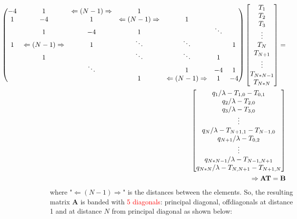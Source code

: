 \documentclass[12pt]{amsart}   %
\begin{document}
\begin{eqnarray} \label{eq:16}
\hspace{-3cm}
\begin{pmatrix}
-4 & 1 & \Leftarrow(N-1)\Rightarrow & 1 &&&\\
1 & -4 & 1 & \Leftarrow(N-1)\Rightarrow & 1 &&\\
 & 1 & -4 & 1 & &\ddots&\\
1 & \Leftarrow(N-1)\Rightarrow & 1 & \ddots &\ddots&&1\\
 & 1 &  & \ddots &\ddots&1&\\
 &  & \ddots & &1&-4&1\\
 &  &  &1 &\Leftarrow(N-1)\Rightarrow& 1&-4\\
\end{pmatrix} \begin{bmatrix}
T_{1}\\
T_{2}\\
T_{3}\\
\vdots \\
T_{N}\\
T_{N+1}\\
\vdots\\
T_{N*N-1}\\
T_{N*N}\\
\end{bmatrix}  = \nonumber \\
\begin{bmatrix}
{q_{1}}/{\lambda}-T_{1,0}-T_{0,1}\\
{q_{2}}/{\lambda}-T_{2,0}\\
{q_{3}}/{\lambda}-T_{3,0}\\
\vdots\\
{q_{N}}/{\lambda}-T_{N+1,1}-T_{N-1,0}\\
{q_{N+1}}/{\lambda}-T_{0,2}\\
\vdots\\
{q_{N*N-1}}/{\lambda}-T_{N-1,N+1}\\
{q_{N*N}}/{\lambda}-T_{N,N+1}-T_{N+1,N}\\
\end{bmatrix} \nonumber \\
\hspace{-2cm} \Rightarrow \textbf{AT}=\textbf{B}\\
\end{eqnarray}
where "$\Leftarrow (N-1)\Rightarrow$" is the distances between the elements. So, the resulting matrix \textbf{A} is banded with \textcolor{red}{5 diagonals}: principal diagonal, offdiagonals at distance 1 and at distance $N$ from principal diagonal as shown below:
\end{document}
